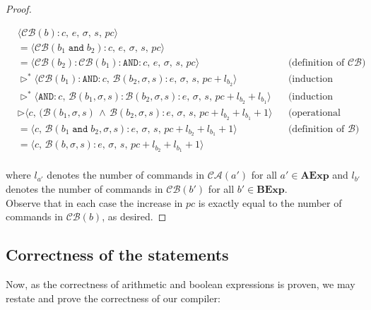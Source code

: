\documentclass{article}
\begin{document}
\begin{proof}
\begin{itemize}
    \[
      \begin{aligned}
        &\langle  \mathcal{CB}(b) : c,\, e,\, \sigma,\, s,\, pc \rangle \\ 
        &= \langle \mathcal{CB}(b_1 \;\texttt{and}\; b_2) : c,\, e,\, \sigma,\, s,\, pc \rangle \\
        &= \langle \mathcal{CB}(b_2) : \mathcal{CB}(b_1) : \texttt{AND} : c,\, e,\, \sigma,\, s,\, pc \rangle 
        && \text{(definition of } \mathcal{CB}\text{)} \\
        &\triangleright^\ast \langle \mathcal{CB}(b_1) : \texttt{AND} : c,\, \mathcal{B}(b_2, \sigma, s) : e,\, \sigma,\, s,\, pc + l_{b_2} \rangle 
        && \text{(induction hypothesis 2)} \\
        &\triangleright^\ast \langle \texttt{AND} : c,\, \mathcal{B}(b_1, \sigma, s) : \mathcal{B}(b_2, \sigma, s) : e,\, \sigma,\, s,\, pc + l_{b_2} + l_{b_1} \rangle 
        && \text{(induction hypothesis 2)} \\
        &\triangleright \langle c,\, (\mathcal{B}(b_1, \sigma, s) \,\land\, \mathcal{B}(b_2, \sigma, s) : e,\, \sigma,\, s,\, pc + l_{b_2} + l_{b_1} + 1 \rangle
        && \text{(operational semantics)} \\
        &= \langle c,\, \mathcal{B}(b_1 \;\texttt{and}\; b_2, \sigma, s) : e,\, \sigma,\, s,\, pc + l_{b_2} + l_{b_1} + 1 \rangle 
        && \text{(definition of } \mathcal{B}\text{)} \\
        &= \langle c,\, \mathcal{B}(b, \sigma, s) : e,\, \sigma,\, s,\, pc + l_{b_2} + l_{b_1} + 1 \rangle \\
      \end{aligned}
  \]
\end{itemize}

where $l_{a'}$ denotes the number of commands in $\mathcal{CA}(a')$ for all $a' \in \textbf{AExp}$ and $l_{b'}$ denotes the number of commands in $\mathcal{CB}(b')$ for all $b' \in \textbf{BExp}$.\\
Observe that in each case the increase in $pc$ is exactly equal to the number of commands in $\mathcal{CB}(b)$, as desired.

\end{proof}

\subsection{Correctness of the statements}

Now, as the correctness of arithmetic and boolean expressions is proven, we may restate and prove the correctness of our compiler:
\end{document}
